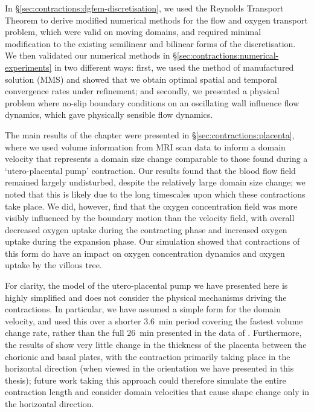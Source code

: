         In \S\ref{sec:contractions:dgfem-discretisation}, we used the Reynolds Transport Theorem to derive modified numerical methods for the flow and oxygen transport problem, which were valid on moving domains, and required minimal modification to the existing semilinear and bilinear forms of the discretisation. We then validated our numerical methods in \S\ref{sec:contractions:numerical-experiments} in two different ways: first, we used the method of manufactured solution (MMS) and showed that we obtain optimal spatial and temporal convergence rates under refinement; and secondly, we presented a physical problem where no-slip boundary conditions on an oscillating wall influence flow dynamics, which gave physically sensible flow dynamics.

        The main results of the chapter were presented in \S\ref{sec:contractions:placenta}, where we used volume information from MRI scan data to inform a domain velocity that represents a domain size change comparable to those found during a `utero-placental pump' contraction. Our results found that the blood flow field remained largely undisturbed, despite the relatively large domain size change; we noted that this is likely due to the long timescales upon which these contractions take place. We did, however, find that the oxygen concentration field was more visibly influenced by the boundary motion than the velocity field, with overall decreased oxygen uptake during the contracting phase and increased oxygen uptake during the expansion phase. Our simulation showed that contractions of this form do have an impact on oxygen concentration dynamics and oxygen uptake by the villous tree.

        For clarity, the model of the utero-placental pump we have presented here is highly simplified and does not consider the physical mechanisms driving the contractions. In particular, we have assumed a simple form for the domain velocity, and used this over a shorter \qty{3.6}{\minute} period covering the fastest volume change rate, rather than the full \qty{26}{\minute} presented in the data of \citeauthor{gowlandCharacterisingPlacentalContractions2024} \cite{gowlandCharacterisingPlacentalContractions2024}. Furthermore, the results of \citeauthor{dellschaftHaemodynamicsHumanPlacenta2020} \cite{dellschaftHaemodynamicsHumanPlacenta2020} show very little change in the thickness of the placenta between the chorionic and basal plates, with the contraction primarily taking place in the horizontal direction (when viewed in the orientation we have presented in this thesis); future work taking this approach could therefore simulate the entire contraction length and consider domain velocities that cause shape change only in the horizontal direction. 

